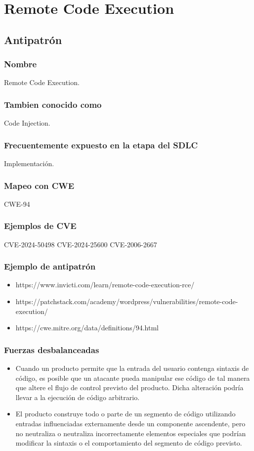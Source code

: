 \chapter{Remote Code Execution}
\section{Antipatrón}
\subsection{Nombre}
Remote Code Execution.
\subsection{Tambien conocido como}
Code Injection. 
\subsection{Frecuentemente expuesto en la etapa del SDLC}
Implementación.
\subsection{Mapeo con CWE}
CWE-94
\subsection{Ejemplos de CVE}
CVE-2024-50498
CVE-2024-25600
CVE-2006-2667
\subsection{Ejemplo de antipatrón}
\begin{itemize}
    \item https://www.invicti.com/learn/remote-code-execution-rce/
    \item https://patchstack.com/academy/wordpress/vulnerabilities/remote-code-execution/
    \item https://cwe.mitre.org/data/definitions/94.html
\end{itemize}
\subsection{Fuerzas desbalanceadas}
\begin{itemize}
    \item Cuando un producto permite que la entrada del usuario contenga sintaxis de código, es posible que un atacante pueda manipular ese código de tal manera que altere el flujo de control previsto del producto. Dicha alteración podría llevar a la ejecución de código arbitrario.
    \item El producto construye todo o parte de un segmento de código utilizando entradas influenciadas externamente desde un componente ascendente, pero no neutraliza o neutraliza incorrectamente elementos especiales que podrían modificar la sintaxis o el comportamiento del segmento de código previsto.
\end{itemize}
